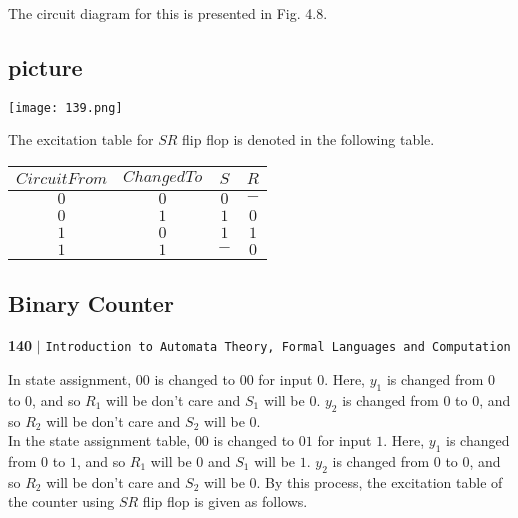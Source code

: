 \documentclass[9pt]{beamer}
\begin{document}
\begin{frame}
The circuit diagram for this is presented in Fig. 4.8.
\begin{center}
\section{picture}
\texttt{[image: 139.png]}
\end{center}

\pause
The excitation table for $SR$ flip flop is denoted in the following table.\\
\begin{center}
\begin{tabular}{cccc}
 \hline

 \hline

 \hline

 \hline
 $Circuit From$ &  $Changed To$ & $S$   &  $R$\\
\hline
 $0$    &    $0$    &   $0$   &  $-$\\
 $0$    &    $1$    &   $1$   &  $0$\\
 $1$    &    $0$    &   $1$   &  $1$\\
 $1$    &    $1$    &   $-$   &  $0$\\
 \hline

 \hline

 \hline

 \hline
\end{tabular}
\end{center}
\end{frame}

\begin{frame}
\section*{Binary Counter}
\begin{flushleft}
    \textbf{140}\hspace*{0.1cm} \textbf{$|$} \hspace*{0.1cm} \texttt{Introduction to Automata Theory, Formal Languages and Computation}
  \end{flushleft}

  \vspace*{2cm}
 \hspace*{0.2cm} In state assignment, $00$ is changed to $00$ for input $0$. Here, $y_1$ is changed from $0$ to $0$, and so $R_1$ will
be don’t care and $S_1$ will be $0$. $y_2$ is changed from $0$ to $0$, and so $R_2$ will be don’t care and $S_2$ will be $0$.\\
In the state assignment table, $00$ is changed to $01$ for input $1$. Here, $y_1$ is changed from $0$ to $1$, and so $R_1$
will be $0$ and $S_1$ will be $1$. $y_2$ is changed from $0$ to $0$, and so $R_2$ will be don’t care and $S_2$ will be $0$. By this
process, the excitation table of the counter using $SR$ flip flop is given as follows.\\
\end{frame}
\end{document}
